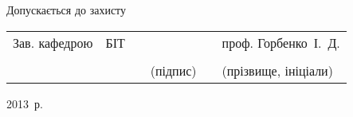 \begin{center}
        \vfill
        \begin{flushleft}
            \hspace{4ex}Допускається до захисту \\[1ex]
        \end{flushleft}
        \begin{tabular}{ 
            p{}
            >{\centering\arraybackslash}p{} 
            >{\centering\arraybackslash}p{} 
            >{\centering\arraybackslash}p{}
            >{\centering\arraybackslash}p{} 
            >{\centering\arraybackslash}p{}}
            Зав. кафедрою & БІТ & & & & проф. Горбенко~І.~Д. \\ \cline{2-2}\cline{4-4}\cline{6-6} \\[-4ex]
                                     & & & {\scriptsize (підпис)} & & {\scriptsize (прізвище, ініціали)} \\[1ex]
        \end{tabular}
        \vfill
        2013~р.
    \end{center}
    \clearpage
